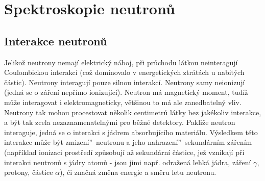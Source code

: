 \documentclass[../../main.tex]{subfiles}
\begin{document}
\chapter{Spektroskopie neutronů}

\section{Interakce neutronů}

Jelikož neutrony nemají elektrický náboj, při průchodu látkou neinteragují Coulombickou interakcí (což dominovalo v energetických ztrátách u nabitých částic). Neutrony interagují pouze silnou interakcí. Neutrony samy neionizují (jedná se o záření nepřímo ionizující). Neutron má magnetický moment, tudíž může interagovat i elektromagneticky, většinou to má ale zanedbatelný vliv. Neutrony tak mohou procestovat několik centimetrů látky bez jakékoliv interakce, a být tak zcela nezaznamenatelnými pro běžné detektory. Pakliže neutron interaguje, jedná se o interakci s jádrem absorbujícího materiálu. Výsledkem této interakce může být \quotedblbase zmizení\textquotedblright ~neutronu a jeho \quotedblbase nahrazení\textquotedblright ~sekundárním zářením (například ionizaci prostředí způsobují až sekundární částice, jež vznikají při interakci neutronů s jádry atomů - jsou jimi např. odražená lehká jádra, záření $\gamma$, protony, částice $\alpha$), či značná změna energie a směru letu neutronu. 
\end{document}
